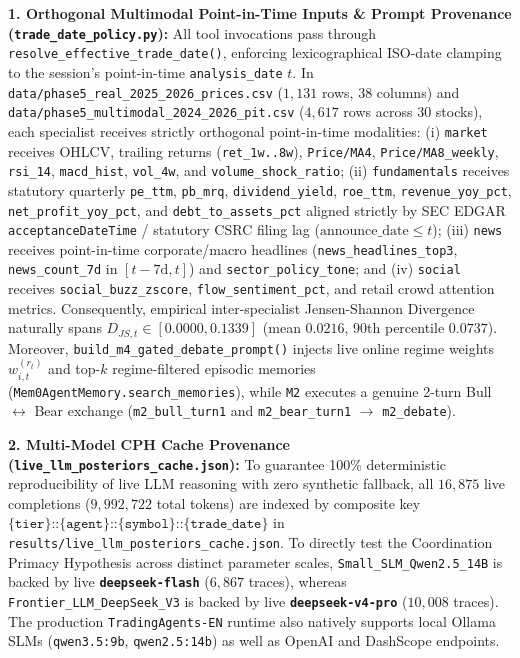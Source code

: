 \documentclass[10pt,a4paper,twocolumn]{article}
\begin{document}
\noindent\textbf{1. Orthogonal Multimodal Point-in-Time Inputs \& Prompt Provenance (\texttt{trade\_date\_policy.py}):} All tool invocations pass through \texttt{resolve\_effective\_trade\_date()}, enforcing lexicographical ISO-date clamping to the session's point-in-time \texttt{analysis\_date} $t$. In \texttt{data/phase5\_real\_2025\_2026\_prices.csv} ($1,131$ rows, 38 columns) and \texttt{data/phase5\_multimodal\_2024\_2026\_pit.csv} ($4,617$ rows across 30 stocks), each specialist receives strictly orthogonal point-in-time modalities: (i) \texttt{market} receives OHLCV, trailing returns (\texttt{ret\_1w..8w}), \texttt{Price/MA4}, \texttt{Price/MA8\_weekly}, \texttt{rsi\_14}, \texttt{macd\_hist}, \texttt{vol\_4w}, and \texttt{volume\_shock\_ratio}; (ii) \texttt{fundamentals} receives statutory quarterly \texttt{pe\_ttm}, \texttt{pb\_mrq}, \texttt{dividend\_yield}, \texttt{roe\_ttm}, \texttt{revenue\_yoy\_pct}, \texttt{net\_profit\_yoy\_pct}, and \texttt{debt\_to\_assets\_pct} aligned strictly by SEC EDGAR \texttt{acceptanceDateTime} / statutory CSRC filing lag ($\text{announce\_date} \le t$); (iii) \texttt{news} receives point-in-time corporate/macro headlines (\texttt{news\_headlines\_top3}, \texttt{news\_count\_7d} in $[t-7\text{d}, t]$) and \texttt{sector\_policy\_tone}; and (iv) \texttt{social} receives \texttt{social\_buzz\_zscore}, \texttt{flow\_sentiment\_pct}, and retail crowd attention metrics. Consequently, empirical inter-specialist Jensen-Shannon Divergence naturally spans $D_{JS,t} \in [0.0000, 0.1339]$ (mean $0.0216$, 90th percentile $0.0737$). Moreover, \texttt{build\_m4\_gated\_debate\_prompt()} injects live online regime weights $w_{i,t}^{(r_t)}$ and top-$k$ regime-filtered episodic memories (\texttt{Mem0AgentMemory.search\_memories}), while \texttt{M2} executes a genuine 2-turn Bull $\leftrightarrow$ Bear exchange (\texttt{m2\_bull\_turn1} and \texttt{m2\_bear\_turn1} $\to$ \texttt{m2\_debate}).

\noindent\textbf{2. Multi-Model CPH Cache Provenance (\texttt{live\_llm\_posteriors\_cache.json}):} To guarantee 100\% deterministic reproducibility of live LLM reasoning with zero synthetic fallback, all $16,875$ live completions ($9,992,722$ total tokens) are indexed by composite key $\texttt{\{tier\}::\{agent\}::\{symbol\}::\{trade\_date\}}$ in \texttt{results/live\_llm\_posteriors\_cache.json}. To directly test the Coordination Primacy Hypothesis across distinct parameter scales, \texttt{Small\_SLM\_Qwen2.5\_14B} is backed by live \textbf{\texttt{deepseek-flash}} ($6,867$ traces), whereas \texttt{Frontier\_LLM\_DeepSeek\_V3} is backed by live \textbf{\texttt{deepseek-v4-pro}} ($10,008$ traces). The production \texttt{TradingAgents-EN} runtime also natively supports local Ollama SLMs (\texttt{qwen3.5:9b}, \texttt{qwen2.5:14b}) as well as OpenAI and DashScope endpoints.
\end{document}
